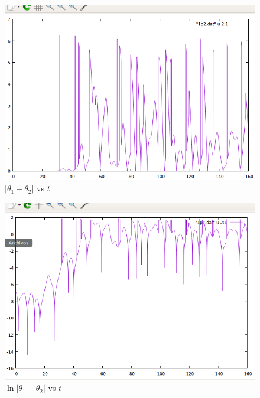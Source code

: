 \documentclass[12pt,a4paper]{article}
\begin{document}
\begin{figure}
    \centering
    \includegraphics[scale=0.7]{1p2abs.PNG}
    \caption{$|\theta_1-\theta_2|$ vs $t$}
\end{figure}

\begin{figure}
    \centering
    \includegraphics[scale=0.7]{1p2logabs.PNG}
    \caption{$\ln{|\theta_1-\theta_2|}$ vs $t$}
\end{figure}
\end{document}
